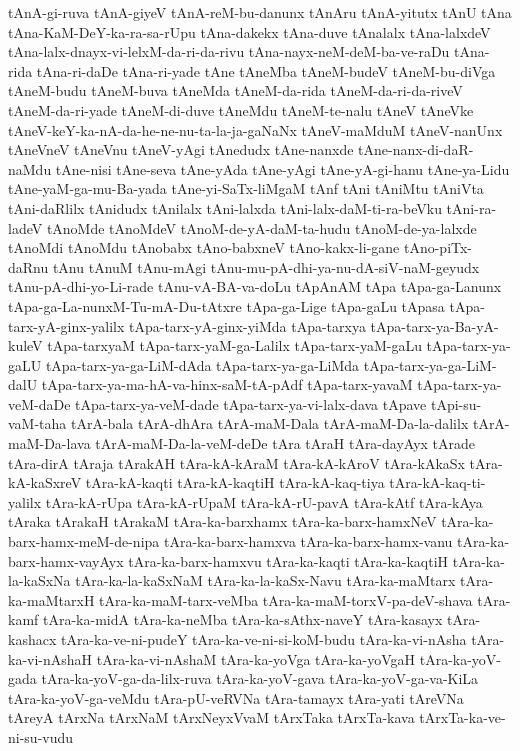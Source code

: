 {tAnA-gi-ruva
tAnA-giyeV
tAnA-reM-bu-danunx
tAnAru
tAnA-yitutx
tAnU
tAna
tAna-KaM-DeY-ka-ra-sa-rUpu
tAna-dakekx
tAna-duve
tAnalalx
tAna-lalxdeV
tAna-lalx-dnayx-vi-lelxM-da-ri-da-rivu
tAna-nayx-neM-deM-ba-ve-raDu
tAna-rida
tAna-ri-daDe
tAna-ri-yade
tAne
tAneMba
tAneM-budeV
tAneM-bu-diVga
tAneM-budu
tAneM-buva
tAneMda
tAneM-da-rida
tAneM-da-ri-da-riveV
tAneM-da-ri-yade
tAneM-di-duve
tAneMdu
tAneM-te-nalu
tAneV
tAneVke
tAneV-keY-ka-nA-da-he-ne-nu-ta-la-ja-gaNaNx
tAneV-maMduM
tAneV-nanUnx
tAneVneV
tAneVnu
tAneV-yAgi
tAnedudx
tAne-nanxde
tAne-nanx-di-daR-naMdu
tAne-nisi
tAne-seva
tAne-yAda
tAne-yAgi
tAne-yA-gi-hanu
tAne-ya-Lidu
tAne-yaM-ga-mu-Ba-yada
tAne-yi-SaTx-liMgaM
tAnf
tAni
tAniMtu
tAniVta
tAni-daRlilx
tAnidudx
tAnilalx
tAni-lalxda
tAni-lalx-daM-ti-ra-beVku
tAni-ra-ladeV
tAnoMde
tAnoMdeV
tAnoM-de-yA-daM-ta-hudu
tAnoM-de-ya-lalxde
tAnoMdi
tAnoMdu
tAnobabx
tAno-babxneV
tAno-kakx-li-gane
tAno-piTx-daRnu
tAnu
tAnuM
tAnu-mAgi
tAnu-mu-pA-dhi-ya-nu-dA-siV-naM-geyudx
tAnu-pA-dhi-yo-Li-rade
tAnu-vA-BA-va-doLu
tApAnAM
tApa
tApa-ga-Lanunx
tApa-ga-La-nunxM-Tu-mA-Du-tAtxre
tApa-ga-Lige
tApa-gaLu
tApasa
tApa-tarx-yA-ginx-yalilx
tApa-tarx-yA-ginx-yiMda
tApa-tarxya
tApa-tarx-ya-Ba-yA-kuleV
tApa-tarxyaM
tApa-tarx-yaM-ga-Lalilx
tApa-tarx-yaM-gaLu
tApa-tarx-ya-gaLU
tApa-tarx-ya-ga-LiM-dAda
tApa-tarx-ya-ga-LiMda
tApa-tarx-ya-ga-LiM-dalU
tApa-tarx-ya-ma-hA-va-hinx-saM-tA-pAdf
tApa-tarx-yavaM
tApa-tarx-ya-veM-daDe
tApa-tarx-ya-veM-dade
tApa-tarx-ya-vi-lalx-dava
tApave
tApi-su-vaM-taha
tArA-bala
tArA-dhAra
tArA-maM-Dala
tArA-maM-Da-la-dalilx
tArA-maM-Da-lava
tArA-maM-Da-la-veM-deDe
tAra
tAraH
tAra-dayAyx
tArade
tAra-dirA
tAraja
tArakAH
tAra-kA-kAraM
tAra-kA-kAroV
tAra-kAkaSx
tAra-kA-kaSxreV
tAra-kA-kaqti
tAra-kA-kaqtiH
tAra-kA-kaq-tiya
tAra-kA-kaq-ti-yalilx
tAra-kA-rUpa
tAra-kA-rUpaM
tAra-kA-rU-pavA
tAra-kAtf
tAra-kAya
tAraka
tArakaH
tArakaM
tAra-ka-barxhamx
tAra-ka-barx-hamxNeV
tAra-ka-barx-hamx-meM-de-nipa
tAra-ka-barx-hamxva
tAra-ka-barx-hamx-vanu
tAra-ka-barx-hamx-vayAyx
tAra-ka-barx-hamxvu
tAra-ka-kaqti
tAra-ka-kaqtiH
tAra-ka-la-kaSxNa
tAra-ka-la-kaSxNaM
tAra-ka-la-kaSx-Navu
tAra-ka-maMtarx
tAra-ka-maMtarxH
tAra-ka-maM-tarx-veMba
tAra-ka-maM-torxV-pa-deV-shava
tAra-kamf
tAra-ka-midA
tAra-ka-neMba
tAra-ka-sAthx-naveY
tAra-kasayx
tAra-kashacx
tAra-ka-ve-ni-pudeY
tAra-ka-ve-ni-si-koM-budu
tAra-ka-vi-nAsha
tAra-ka-vi-nAshaH
tAra-ka-vi-nAshaM
tAra-ka-yoVga
tAra-ka-yoVgaH
tAra-ka-yoV-gada
tAra-ka-yoV-ga-da-lilx-ruva
tAra-ka-yoV-gava
tAra-ka-yoV-ga-va-KiLa
tAra-ka-yoV-ga-veMdu
tAra-pU-veRVNa
tAra-tamayx
tAra-yati
tAreVNa
tAreyA
tArxNa
tArxNaM
tArxNeyxVvaM
tArxTaka
tArxTa-kava
tArxTa-ka-ve-ni-su-vudu
}
